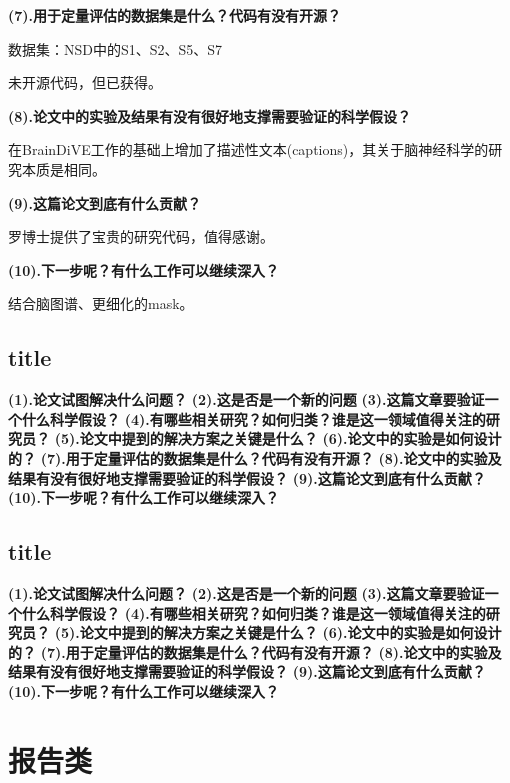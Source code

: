 \documentclass[12pt, a4paper, oneside]{ctexart}
\begin{document}
    \noindent\textbf{(7).用于定量评估的数据集是什么？代码有没有开源？}

    数据集：NSD\cite{Allen2022}中的S1、S2、S5、S7

    未开源代码，但已获得。

    \noindent\textbf{(8).论文中的实验及结果有没有很好地支撑需要验证的科学假设？}

    在BrainDiVE工作的基础上增加了描述性文本(captions)，其关于脑神经科学的研究本质是相同。

    \noindent\textbf{(9).这篇论文到底有什么贡献？}

    罗博士提供了宝贵的研究代码，值得感谢。

    \noindent\textbf{(10).下一步呢？有什么工作可以继续深入？}

    结合脑图谱、更细化的mask。

    \subsection{title}
    \noindent\textbf{(1).论文试图解决什么问题？}
    \noindent\textbf{(2).这是否是一个新的问题}
    \noindent\textbf{(3).这篇文章要验证一个什么科学假设？}
    \noindent\textbf{(4).有哪些相关研究？如何归类？谁是这一领域值得关注的研究员？}
    \noindent\textbf{(5).论文中提到的解决方案之关键是什么？}
    \noindent\textbf{(6).论文中的实验是如何设计的？}
    \noindent\textbf{(7).用于定量评估的数据集是什么？代码有没有开源？}
    \noindent\textbf{(8).论文中的实验及结果有没有很好地支撑需要验证的科学假设？}
    \noindent\textbf{(9).这篇论文到底有什么贡献？}
    \noindent\textbf{(10).下一步呢？有什么工作可以继续深入？}

    \subsection{title}
    \noindent\textbf{(1).论文试图解决什么问题？}
    \noindent\textbf{(2).这是否是一个新的问题}
    \noindent\textbf{(3).这篇文章要验证一个什么科学假设？}
    \noindent\textbf{(4).有哪些相关研究？如何归类？谁是这一领域值得关注的研究员？}
    \noindent\textbf{(5).论文中提到的解决方案之关键是什么？}
    \noindent\textbf{(6).论文中的实验是如何设计的？}
    \noindent\textbf{(7).用于定量评估的数据集是什么？代码有没有开源？}
    \noindent\textbf{(8).论文中的实验及结果有没有很好地支撑需要验证的科学假设？}
    \noindent\textbf{(9).这篇论文到底有什么贡献？}
    \noindent\textbf{(10).下一步呢？有什么工作可以继续深入？}

    \section{报告类}
\end{document}
